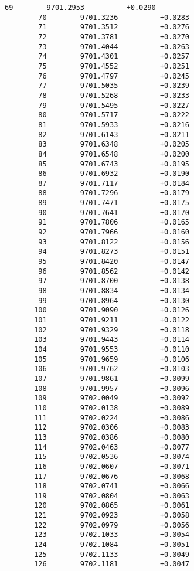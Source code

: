 \documentclass[11pt]{article}
\begin{document}
\begin{Verbatim}[commandchars=\\\{\}]
        69        9701.2953          +0.0290
        70        9701.3236          +0.0283
        71        9701.3512          +0.0276
        72        9701.3781          +0.0270
        73        9701.4044          +0.0263
        74        9701.4301          +0.0257
        75        9701.4552          +0.0251
        76        9701.4797          +0.0245
        77        9701.5035          +0.0239
        78        9701.5268          +0.0233
        79        9701.5495          +0.0227
        80        9701.5717          +0.0222
        81        9701.5933          +0.0216
        82        9701.6143          +0.0211
        83        9701.6348          +0.0205
        84        9701.6548          +0.0200
        85        9701.6743          +0.0195
        86        9701.6932          +0.0190
        87        9701.7117          +0.0184
        88        9701.7296          +0.0179
        89        9701.7471          +0.0175
        90        9701.7641          +0.0170
        91        9701.7806          +0.0165
        92        9701.7966          +0.0160
        93        9701.8122          +0.0156
        94        9701.8273          +0.0151
        95        9701.8420          +0.0147
        96        9701.8562          +0.0142
        97        9701.8700          +0.0138
        98        9701.8834          +0.0134
        99        9701.8964          +0.0130
       100        9701.9090          +0.0126
       101        9701.9211          +0.0122
       102        9701.9329          +0.0118
       103        9701.9443          +0.0114
       104        9701.9553          +0.0110
       105        9701.9659          +0.0106
       106        9701.9762          +0.0103
       107        9701.9861          +0.0099
       108        9701.9957          +0.0096
       109        9702.0049          +0.0092
       110        9702.0138          +0.0089
       111        9702.0224          +0.0086
       112        9702.0306          +0.0083
       113        9702.0386          +0.0080
       114        9702.0463          +0.0077
       115        9702.0536          +0.0074
       116        9702.0607          +0.0071
       117        9702.0676          +0.0068
       118        9702.0741          +0.0066
       119        9702.0804          +0.0063
       120        9702.0865          +0.0061
       121        9702.0923          +0.0058
       122        9702.0979          +0.0056
       123        9702.1033          +0.0054
       124        9702.1084          +0.0051
       125        9702.1133          +0.0049
       126        9702.1181          +0.0047

\end{Verbatim}
\end{document}

